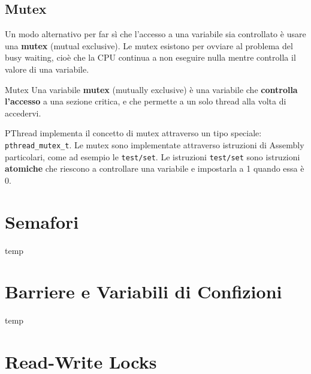 \subsection{Mutex}

Un modo alternativo per far sì che l'accesso a una variabile sia controllato è usare una \textbf{mutex} (mutual exclusive). Le mutex esistono per ovviare al problema del busy waiting, cioè che la CPU continua a non eseguire nulla mentre controlla il valore di una variabile.

\begin{definition}{Mutex}
    Una variabile \textbf{mutex} (mutually exclusive) è una variabile che \textbf{controlla l'accesso} a una sezione critica, e che permette a un solo thread alla volta di accedervi.
\end{definition}

PThread implementa il concetto di mutex attraverso un tipo speciale: \verb|pthread_mutex_t|. Le mutex sono implementate attraverso istruzioni di Assembly particolari, come ad esempio le \texttt{test/set}. Le istruzioni \texttt{test/set} sono istruzioni \textbf{atomiche} che riescono a controllare una variabile e impostarla a 1 quando essa è 0. 

\section{Semafori}

temp

\section{Barriere e Variabili di Confizioni}

temp

\section{Read-Write Locks}

%
%

